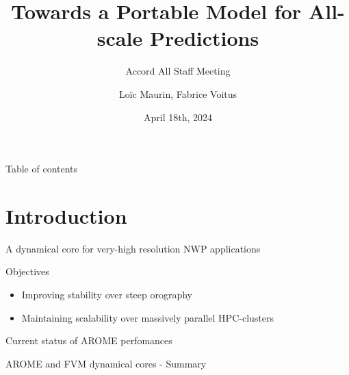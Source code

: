 \documentclass{beamer}
\title[Accord All Staff Meeting]{Towards a Portable Model for All-scale Predictions}
\subtitle{Accord All Staff Meeting}
\author{Loïc Maurin, Fabrice Voitus}
\institute[CNRM]{Centre National de Recherche Météorologique}
\date{April 18th, 2024}
\begin{document}
\frame{\titlepage}

\begin{frame}{Table of contents}
    \tableofcontents
\end{frame}

\section{Introduction}
\begin{frame}{A dynamical core for very-high resolution NWP applications}

    \begin{block}{Objectives}
        \begin{itemize}
            \item[\faIcon{mountain}] Improving stability over steep orography
            \item[\faIcon{laptop-code}] Maintaining scalability over massively parallel HPC-clusters
        \end{itemize}
    \end{block}

\end{frame}

\begin{frame}{Current status of AROME perfomances}

\end{frame}

\begin{frame}{AROME and FVM dynamical cores - Summary}
    \begin{center}
    \end{center}
\end{frame}
\end{document}
